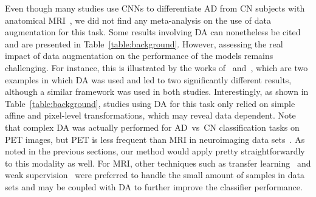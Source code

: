 \documentclass[10pt,journal,compsoc]{IEEEtran}
\begin{document}
Even though many studies use CNNs to differentiate AD from CN subjects with anatomical MRI~\cite{wen_convolutional_2020}, we did not find any meta-analysis on the use of data augmentation for this task. Some results involving DA can nonetheless be cited and are presented in Table~\ref{table:background}. However, assessing the real impact of data augmentation on the performance of the models remains challenging. For instance, this is illustrated by the works of~\cite{aderghal_classification_2017} and~\cite{aderghal_classification_2018}, which are two examples in which DA was used and led to two significantly different results, although a similar framework was used in both studies. Interestingly, as shown in Table~\ref{table:background}, studies using DA for this task only relied on simple affine and pixel-level transformations, which may reveal data dependent. Note that complex DA was actually performed for AD~vs~CN classification tasks on PET images, but PET is less frequent than MRI in neuroimaging data sets~\cite{islam_gan-based_2020}. As noted in the previous sections, our method would apply pretty straightforwardly to this modality as well. For MRI, other techniques such as transfer learning~\cite{oh_classification_2019} and weak supervision~\cite{liu_weakly_2020} were preferred to handle the small amount of samples in data sets and may be coupled with DA to further improve the classifier performance.




\end{document}
